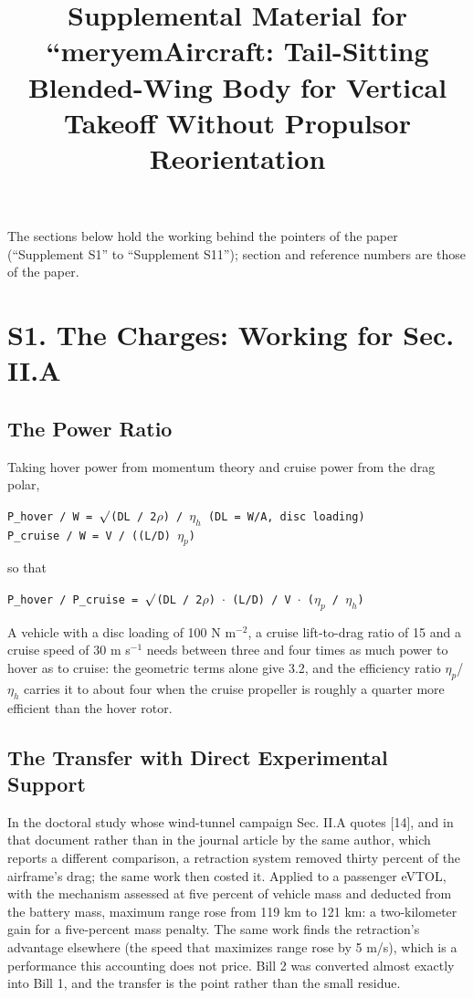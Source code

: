 \documentclass[journal]{new-aiaa}
\title{Supplemental Material for ``meryemAircraft: Tail-Sitting Blended-Wing Body for Vertical Takeoff Without Propulsor Reorientation}
\author{}
\date{}
\begin{document}
\maketitle

The sections below hold the working behind the pointers of the paper (``Supplement S1'' to ``Supplement S11''); section and reference numbers are those of the paper.



\section*{S1. The Charges: Working for Sec. II.A}

\subsection*{The Power Ratio}

Taking hover power from momentum theory and cruise power from the drag polar,

\begin{center}
\texttt{P\_hover / W  = $\surd$(DL / 2$\rho$) / $\eta_h$                 (DL = W/A, disc loading)} \\
\texttt{P\_cruise / W = V / ((L/D) $\eta_p$)}
\end{center}

so that

\begin{center}
\texttt{P\_hover / P\_cruise = $\surd$(DL / 2$\rho$) $\cdot$ (L/D) / V $\cdot$ ($\eta_p$ / $\eta_h$)}
\end{center}

A vehicle with a disc loading of 100 N m$^{-2}$, a cruise lift-to-drag ratio of 15 and a cruise speed of 30 m s$^{-1}$ needs between three and four times as much power to hover as to cruise: the geometric terms alone give 3.2, and the efficiency ratio $\eta_p$/$\eta_h$ carries it to about four when the cruise propeller is roughly a quarter more efficient than the hover rotor.

\subsection*{The Transfer with Direct Experimental Support}

In the doctoral study whose wind-tunnel campaign Sec. II.A quotes [14], and in that document rather than in the journal article by the same author, which reports a different comparison, a retraction system removed thirty percent of the airframe's drag; the same work then costed it. Applied to a passenger eVTOL, with the mechanism assessed at five percent of vehicle mass and deducted from the battery mass, maximum range rose from 119 km to 121 km: a two-kilometer gain for a five-percent mass penalty. The same work finds the retraction's advantage elsewhere (the speed that maximizes range rose by 5 m/s), which is a performance this accounting does not price. Bill 2 was converted almost exactly into Bill 1, and the transfer is the point rather than the small residue.
\end{document}
